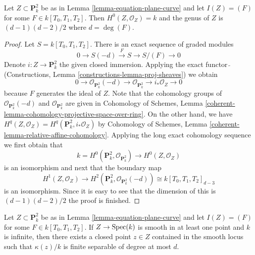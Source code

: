 \begin{lemma}
\label{lemma-genus-plane-curve}
Let $Z \subset \mathbf{P}^2_k$ be as in Lemma \ref{lemma-equation-plane-curve}
and let $I(Z) = (F)$ for some $F \in k[T_0, T_1, T_2]$.
Then $H^0(Z, \mathcal{O}_Z) = k$ and the genus of $Z$ is
$(d - 1)(d - 2)/2$ where $d = \deg(F)$.
\end{lemma}

\begin{proof}
Let $S = k[T_0, T_1, T_2]$.
There is an exact sequence of graded modules
$$
0 \to S(-d) \xrightarrow{F} S \to S/(F) \to 0
$$
Denote $i : Z \to \mathbf{P}^2_k$ the given closed immersion.
Applying the exact functor $\widetilde{\ }$
(Constructions, Lemma \ref{constructions-lemma-proj-sheaves})
we obtain
$$
0 \to \mathcal{O}_{\mathbf{P}^2_k}(-d) \to
\mathcal{O}_{\mathbf{P}^2_k} \to i_*\mathcal{O}_Z \to 0
$$
because $F$ generates the ideal of $Z$.
Note that the cohomology groups of $\mathcal{O}_{\mathbf{P}^2_k}(-d)$ and
$\mathcal{O}_{\mathbf{P}^2_k}$ are given in
Cohomology of Schemes, Lemma
\ref{coherent-lemma-cohomology-projective-space-over-ring}.
On the other hand, we have
$H^q(Z, \mathcal{O}_Z) = H^q(\mathbf{P}^2_k, i_*\mathcal{O}_Z)$ by
Cohomology of Schemes, Lemma \ref{coherent-lemma-relative-affine-cohomology}.
Applying the long exact cohomology sequence
we first obtain that
$$
k = H^0(\mathbf{P}^2_k, \mathcal{O}_{\mathbf{P}^2_k}) \longrightarrow
H^0(Z, \mathcal{O}_Z)
$$
is an isomorphism and next that the boundary map
$$
H^1(Z, \mathcal{O}_Z) \longrightarrow
H^2(\mathbf{P}^2_k, \mathcal{O}_{\mathbf{P}^2_k}(-d)) \cong
k[T_0, T_1, T_2]_{d - 3}
$$
is an isomorphism. Since it is easy to see that the dimension of this
is $(d - 1)(d - 2)/2$ the proof is finished.
\end{proof}

\begin{lemma}
\label{lemma-smooth-plane-curve-point-over-separable}
Let $Z \subset \mathbf{P}^2_k$ be as in Lemma \ref{lemma-equation-plane-curve}
and let $I(Z) = (F)$ for some $F \in k[T_0, T_1, T_2]$.
If $Z \to \mathop{\mathrm{Spec}}(k)$ is smooth in at least one point and $k$ is infinite, then
there exists a closed point $z \in Z$ contained in the smooth
locus such that $\kappa(z)/k$ is finite separable of degree
at most $d$.
\end{lemma}


